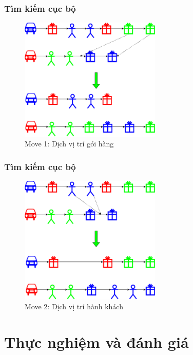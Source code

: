 \documentclass{beamer}
\begin{document}
	\begin{frame}
		\frametitle{Tìm kiếm cục bộ}
		\begin{figure}
			\centering
			\caption{Move 1: Dịch vị trí gói hàng}
			\includegraphics[width=0.6\textwidth]{images/cbls-good.png}
		\end{figure}
	\end{frame}

	\begin{frame}
		\frametitle{Tìm kiếm cục bộ}
		\begin{figure}
			\centering
			\caption{Move 2: Dịch vị trí hành khách}
			\includegraphics[width=0.6\textwidth]{images/cbls-people.png}
		\end{figure}
	\end{frame}
	
	\section{Thực nghiệm và đánh giá}
	



	
\end{document}
